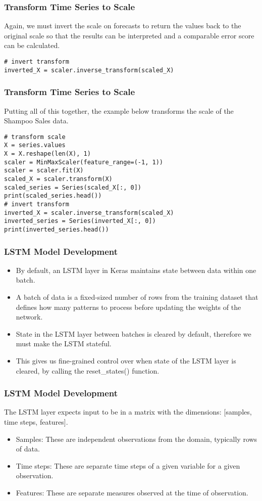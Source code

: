 \begin{frame}[fragile] \frametitle{Transform Time Series to Scale}
Again, we must invert the scale on forecasts to return the values back to the original scale so that the results can be interpreted and a comparable error score can be calculated.
\begin{lstlisting}
# invert transform
inverted_X = scaler.inverse_transform(scaled_X)
\end{lstlisting}   
\end{frame}

\begin{frame}[fragile] \frametitle{Transform Time Series to Scale}
Putting all of this together, the example below transforms the scale of the Shampoo Sales data.
\begin{lstlisting}
# transform scale
X = series.values
X = X.reshape(len(X), 1)
scaler = MinMaxScaler(feature_range=(-1, 1))
scaler = scaler.fit(X)
scaled_X = scaler.transform(X)
scaled_series = Series(scaled_X[:, 0])
print(scaled_series.head())
# invert transform
inverted_X = scaler.inverse_transform(scaled_X)
inverted_series = Series(inverted_X[:, 0])
print(inverted_series.head())
\end{lstlisting}   
\end{frame}

\begin{frame}[fragile] \frametitle{LSTM Model Development}
\begin{itemize}
\item By default, an LSTM layer in Keras maintains state between data within one batch. 
\item A batch of data is a fixed-sized number of rows from the training dataset that defines how many patterns to process before updating the weights of the network. 
\item State in the LSTM layer between batches is cleared by default, therefore we must make the LSTM stateful. 
\item This gives us fine-grained control over when state of the LSTM layer is cleared, by calling the reset\_states() function.
\end{itemize}
\end{frame}

\begin{frame}[fragile] \frametitle{LSTM Model Development}
The LSTM layer expects input to be in a matrix with the dimensions: [samples, time steps, features].
\begin{itemize}
\item 
    Samples: These are independent observations from the domain, typically rows of data.
\item Time steps: These are separate time steps of a given variable for a given observation.
\item  Features: These are separate measures observed at the time of observation.
\end{itemize}
\end{frame}

